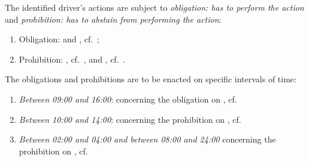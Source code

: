 The identified driver's actions are subject to \textit{obligation: has to perform the action} and \emph{prohibition: has to abstain from performing the action}: 
\begin{enumerate}
    \item Obligation: \delAtGate and \delAtPark, cf.~\DC;
    \item Prohibition: \delAtGate, cf.~\MA, and \delAtPark, cf.~\SR.
\end{enumerate}
The obligations and prohibitions are to be enacted on specific intervals of time:
%
\begin{enumerate}
\item \textit{Between 09:00 and 16:00}: concerning the obligation on \delAtPark, cf.~\DC
\item \textit{Between 10:00 and 14:00}: concerning the prohibition on \delAtPark, cf.~\SR
\item \textit{Between 02:00 and 04:00 and between 08:00 and 24:00} concerning the prohibition on \delAtGate, cf.~\MA
\end{enumerate}




